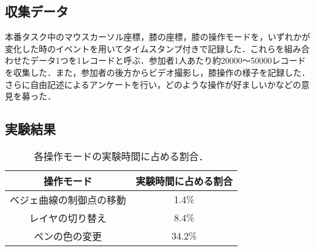 \documentclass[submit, techrep]{ipsj}
\begin{document}
\subsection{収集データ}
本番タスク中のマウスカーソル座標，膝の座標，膝の操作モードを，いずれかが変化した時のイベントを用いてタイムスタンプ付きで記録した．これらを組み合わせたデータ1つを1レコードと呼ぶ．参加者1人あたり約20000〜50000レコードを収集した．また，参加者の後方からビデオ撮影し，膝操作の様子を記録した．さらに自由記述によるアンケートを行い，どのような操作が好ましいかなどの意見を募った．

\subsection{実験結果}
\begin{table}[h]
	\caption{各操作モードの実験時間に占める割合．}
	\label{tb:mode_time}
	\begin{center}
		\begin{tabular}{c|c}
			操作モード    & 実験時間に占める割合 \\ \hline
			ベジェ曲線の制御点の移動 & 1.4\%      \\ 
			レイヤの切り替え & 8.4\%      \\
			ペンの色の変更 & 34.2\%     \\ 
		\end{tabular}
	\end{center}

\end{table}
\end{document}
